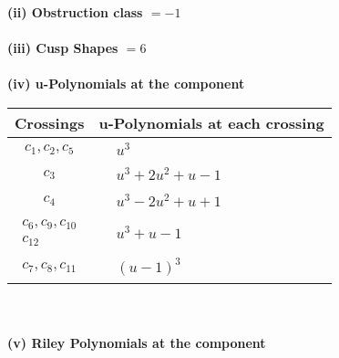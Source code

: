 \documentclass[1p]{elsarticle_modified}
\theoremstyle{definition}
\begin{document}
\flushleft \textbf{(ii) Obstruction class $= -1$}\\~\\
\flushleft \textbf{(iii) Cusp Shapes $= 6$}\\~\\
\newpage\renewcommand{\arraystretch}{1}
\flushleft \textbf{(iv) u-Polynomials at the component}\newline \\
\begin{tabular}{m{50pt}|m{274pt}}
Crossings & \hspace{64pt}u-Polynomials at each crossing \\
\hline $$\begin{aligned}c_{1},c_{2},c_{5}\end{aligned}$$&$\begin{aligned}
&u^3
\end{aligned}$\\
\hline $$\begin{aligned}c_{3}\end{aligned}$$&$\begin{aligned}
&u^3+2 u^2+u-1
\end{aligned}$\\
\hline $$\begin{aligned}c_{4}\end{aligned}$$&$\begin{aligned}
&u^3-2 u^2+u+1
\end{aligned}$\\
\hline $$\begin{aligned}c_{6},c_{9},c_{10}\\c_{12}\end{aligned}$$&$\begin{aligned}
&u^3+u-1
\end{aligned}$\\
\hline $$\begin{aligned}c_{7},c_{8},c_{11}\end{aligned}$$&$\begin{aligned}
&(u-1)^3
\end{aligned}$\\
\hline
\end{tabular}\\~\\
\newpage\renewcommand{\arraystretch}{1}
\flushleft \textbf{(v) Riley Polynomials at the component}\newline \\
\end{document}
